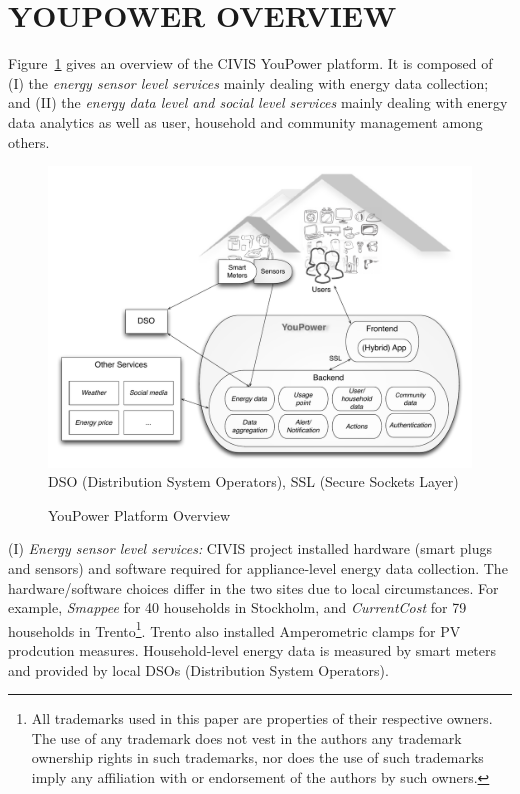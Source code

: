 
\section{\uppercase{YouPower Overview}}
\label{sect:overview}

\noindent Figure~\ref{fig:platform} gives an overview of the CIVIS YouPower platform. 
It is composed of (I) the \textit{energy sensor level services} mainly dealing with energy data collection; and (II) the \textit{energy data level and social level services} mainly dealing with energy data analytics as well as user, household and community management among others. 

\begin{figure}[h!]
\begin{center}\footnotesize
	\includegraphics[width=1.0\linewidth]{img/civis_platform_overview.pdf}\\
	DSO (Distribution System Operators),  SSL (Secure Sockets Layer)
	\caption{YouPower Platform Overview}\label{fig:platform}
\end{center}
\end{figure}

(I) \textit{Energy sensor level services:} CIVIS project installed hardware (smart plugs and sensors) and software required for appliance-level energy data collection. The hardware/software choices differ in the two sites due to local circumstances. For example, \textit{Smappee} for 40 households in Stockholm, and \textit{CurrentCost} for 79 households in Trento\footnote{All trademarks used in this paper are properties of their respective owners. The use of any trademark does not vest in the authors any trademark ownership rights in such trademarks, nor does the use of such trademarks imply any affiliation with or endorsement of the authors by such owners.}. Trento also installed Amperometric clamps for PV prodcution measures.
Household-level energy data is measured by smart meters and provided by local DSOs (Distribution System Operators). 

